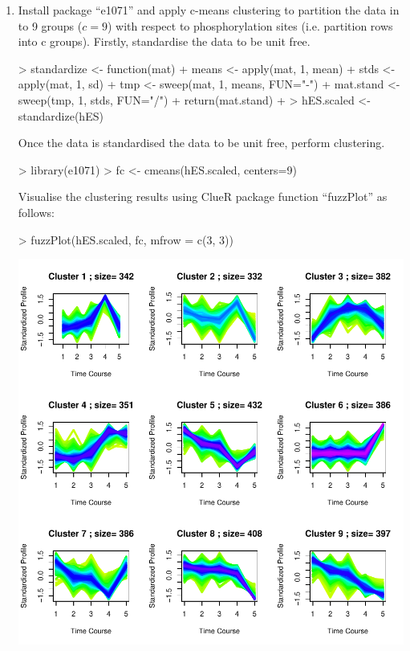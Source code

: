 \documentclass[twoside]{article}
\theoremstyle{definition}
\theoremstyle{definition}
\begin{document}
\begin{enumerate}
\item Install package “e1071” and apply c-means clustering to partition the data in to 9
groups ($c=9$) with respect to phosphorylation sites (i.e. partition rows into c groups).
Firstly, standardise the data to be unit free.

\begin{Schunk}
\begin{Sinput}
> standardize <- function(mat) {
+ means <- apply(mat, 1, mean)
+ stds <- apply(mat, 1, sd)
+ tmp <- sweep(mat, 1, means, FUN="-")
+ mat.stand <- sweep(tmp, 1, stds, FUN="/")
+ return(mat.stand)
+ }
> hES.scaled <- standardize(hES)
\end{Sinput}
\end{Schunk}
Once the data is standardised the data to be unit free, perform clustering.
\begin{Schunk}
\begin{Sinput}
> library(e1071)
> fc <- cmeans(hES.scaled, centers=9)
\end{Sinput}
\end{Schunk}
Visualise the clustering results using ClueR package function “fuzzPlot” as follows:
\begin{Schunk}
\begin{Sinput}
> fuzzPlot(hES.scaled, fc, mfrow = c(3, 3))
\end{Sinput}
\end{Schunk}
\includegraphics{w2-007}


\end{enumerate}
\end{document}
